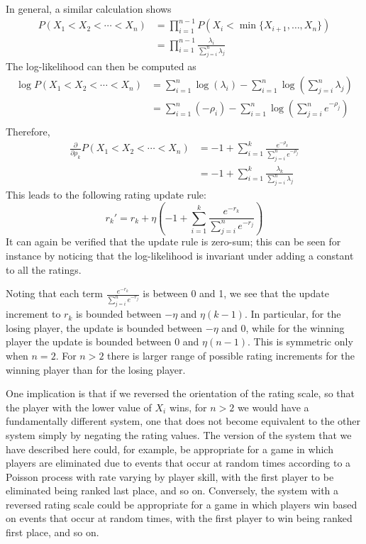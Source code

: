 \documentclass{article}
\begin{document}
	In general, a similar calculation shows
	\begin{align*}
		P(X_1 < X_2 < \cdots < X_n) &= \prod_{i=1}^{n-1} P(X_i < \min\{X_{i+1}, \dots, X_n\})\\
		&= \prod_{i=1}^{n-1} \frac{\lambda_i}{\sum_{j=i}^n \lambda_j}
	\end{align*}
	The log-likelihood can then be computed as
	\begin{align*}
		\log P(X_1 < X_2 < \cdots < X_n) &= \sum_{i=1}^n \log(\lambda_i) - \sum_{i=1}^n \log\left(\sum_{j=i}^n \lambda_j\right) \\
		&= \sum_{i=1}^n (-\rho_i) - \sum_{i=1}^n \log\left(\sum_{j=i}^n e^{-\rho_j}\right) \\
	\end{align*}
	Therefore,
	\begin{align*}
		\frac{\partial}{\partial \rho_k} P(X_1 < X_2 < \cdots < X_n) &= -1 + \sum_{i=1}^k \frac{e^{-\rho_k}}{\sum_{j=i}^n e^{-\rho_j}} \\
		&= -1 + \sum_{i=1}^k \frac{\lambda_k}{\sum_{j=i}^n \lambda_j}
	\end{align*}
	This leads to the following rating update rule:
	$$r_k' = r_k + \eta\left(-1 + \sum_{i=1}^k \frac{e^{-r_k}}{\sum_{j=i}^n e^{-r_j}}\right)$$
	It can again be verified that the update rule is zero-sum; this can be seen for instance by noticing that the log-likelihood is invariant under
	adding a constant to all the ratings. 
	
	Noting that each term $\frac{e^{-r_k}}{\sum_{j=i}^n e^{-r_j}}$ is between 0 and 1, we see that the update
	increment to $r_k$ is bounded between $-\eta$ and $\eta(k - 1)$. In particular, for the losing player, the update is bounded between $-\eta$ and 0, while for the winning player the update is bounded between 0 and $\eta(n - 1)$. This is symmetric only when $n=2$. For $n>2$ there is larger range of
	possible rating increments for the winning player than for the losing player.
	
	One implication is that if we reversed the orientation of the rating scale, so that the player with the lower value of $X_i$ wins, for $n>2$ we would have
	a fundamentally different system, one that does not become equivalent to the other system simply by negating the rating values.
	The version of the system that we have described here could, for example, be appropriate for a game in which players are eliminated due to events that
	occur at random times according to a Poisson process with rate varying by player skill, with the first player to be eliminated being ranked last place, and so on. Conversely, the system with a reversed rating scale could be appropriate for a game in which players win based on events that occur at random times, with the
	first player to win being ranked first place, and so on.
	
\end{document}
